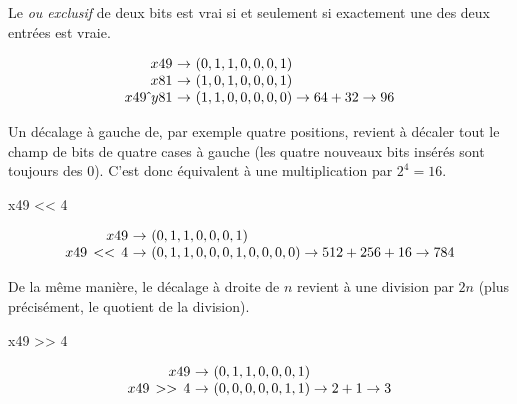 Le \textit{ou exclusif} de deux bits est vrai si et seulement si exactement une des deux entrées est vraie.

\vspace{-0.7\baselineskip}
\begin{equation}
\begin{array}{r@{~}c@{~}l}
x49 & \rightarrow & (0, 1, 1, 0, 0, 0, 1) \\
x81 & \rightarrow & (1, 0, 1, 0, 0, 0, 1) \\
x49\, \hat{} \, y81 &\rightarrow & (1, 1, 0, 0, 0, 0, 0) \rightarrow 64 + 32 \rightarrow 96
\end{array}
\end{equation}


Un décalage à gauche de, par exemple quatre positions, revient à décaler tout le champ de bits de quatre cases à gauche (les quatre nouveaux bits insérés sont toujours des 0). C'est donc équivalent à une multiplication par $2^4 = 16$.

\begin{idleconsole}
	\begin{pyconsole}
		x49 << 4
	\end{pyconsole}
\end{idleconsole}

\vspace*{-1.2\baselineskip}

\begin{equation}
\begin{array}{r@{~}c@{~}l}
x49 & \rightarrow & (0, 1, 1, 0, 0, 0, 1) \\
x49\, << \, 4 &\rightarrow & (0, 1, 1, 0, 0, 0, 1, 0, 0, 0, 0) \rightarrow 512 + 256 + 16 \rightarrow 784
\end{array}
\end{equation}

De la même manière, le décalage à droite de $n$ revient à une division par $2n$ (plus précisément, le quotient de la division).

\begin{idleconsole}
	\begin{pyconsole}
		x49 >> 4
	\end{pyconsole}
\end{idleconsole}

\begin{equation}
\begin{array}{r@{~}c@{~}l}
x49 & \rightarrow & (0, 1, 1, 0, 0, 0, 1) \\
x49\, >> \, 4 &\rightarrow & (0, 0, 0, 0, 0, 1, 1) \rightarrow 2 + 1 \rightarrow 3
\end{array}
\end{equation}

